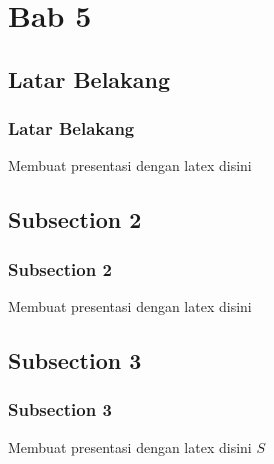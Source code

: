 \section{Bab 5}
\subsection{Latar Belakang}
\begin{frame}
\frametitle{Latar Belakang}
Membuat presentasi dengan latex disini
\end{frame}

\subsection{Subsection 2}
\begin{frame}
\frametitle{Subsection 2}
Membuat presentasi dengan latex disini
\end{frame}

\subsection{Subsection 3}
\begin{frame}
\frametitle{Subsection 3}
Membuat presentasi dengan latex disini $S$
\end{frame}